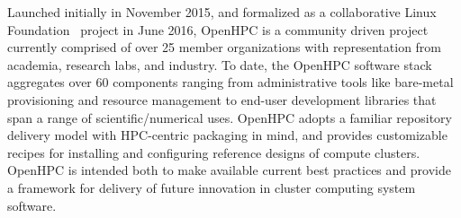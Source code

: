 Launched initially in November 2015, and formalized as a collaborative Linux
Foundation~\cite{LinuxFoundation_url} project in June 2016, OpenHPC is a
community driven project currently comprised of over 25 member organizations
with representation from academia, research labs, and industry. To date, the
OpenHPC software stack aggregates over 60 components ranging from
administrative tools like bare-metal provisioning and resource management to
end-user development libraries that span a range of scientific/numerical
uses. OpenHPC adopts a familiar repository delivery model with HPC-centric
packaging in mind, and provides customizable recipes for
installing and configuring reference designs of compute clusters.
OpenHPC is intended both to make available current best practices and provide a
framework for delivery of future innovation in cluster computing system software.
